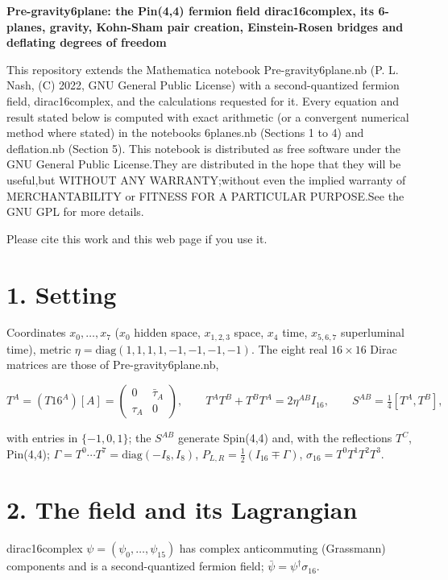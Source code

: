 \documentclass[10pt]{article}
\makeatletter
\newcommand\keepnext{\par\nopagebreak\@nobreaktrue\everypar{\@nobreakfalse\everypar{}}}
\makeatother
\begin{document}
{\raggedright\LARGE\bfseries Pre-gravity6plane: the Pin(4,4) fermion field dirac16complex, its 6-planes, gravity, Kohn-Sham pair creation, Einstein-Rosen bridges and deflating degrees of freedom\par}\medskip

This repository extends the Mathematica notebook Pre-gravity6plane.nb (P. L. Nash, (C) 2022, GNU General Public License) with a second-quantized fermion field, dirac16complex, and the calculations requested for it. Every equation and result stated below is computed with exact arithmetic (or a convergent numerical method where stated) in the notebooks 6planes.nb (Sections 1 to 4) and deflation.nb (Section 5). This notebook is distributed as free software under the GNU General Public License.They are distributed in the hope that they will  be useful,but WITHOUT ANY WARRANTY;without even the implied warranty of MERCHANTABILITY or FITNESS FOR A PARTICULAR PURPOSE.See the GNU GPL for more details.


Please  cite  this  work  and this web page if you use it.


\section*{1. Setting}

Coordinates $x_0,\dots,x_7$ ($x_0$ hidden space, $x_{1,2,3}$ space, $x_4$ time, $x_{5,6,7}$ superluminal time), metric $\eta = \mathrm{diag}(1,1,1,1,-1,-1,-1,-1)$. The eight real $16\times16$ Dirac matrices are those of Pre-gravity6plane.nb,\keepnext


\[
T^A = (T16^A)[A] = \begin{pmatrix}0&\bar\tau_A\\ \tau_A&0\end{pmatrix},\qquad T^AT^B + T^BT^A = 2\eta^{AB}I_{16},\qquad S^{AB} = \tfrac14[T^A,T^B],
\]

with entries in $\{-1,0,1\}$; the $S^{AB}$ generate Spin(4,4) and, with the reflections $T^C$, Pin(4,4); $\Gamma = T^0\cdots T^7 = \mathrm{diag}(-I_8,I_8)$, $P_{L,R} = \frac12(I_{16}\mp\Gamma)$, $\sigma_{16} = T^0T^1T^2T^3$.


\section*{2. The field and its Lagrangian}

dirac16complex $\psi = (\psi_0,\dots,\psi_{15})$ has complex anticommuting (Grassmann) components and is a second-quantized fermion field; $\bar\psi = \psi^\dagger\sigma_{16}$.\keepnext
\end{document}
